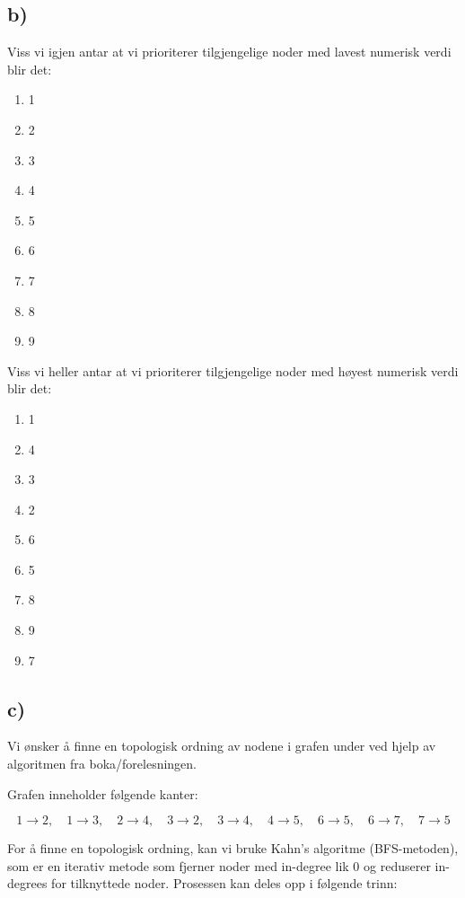 \documentclass[12pt]{article}
\begin{document}
\subsection*{b)}
Viss vi igjen antar at vi prioriterer tilgjengelige noder med lavest numerisk verdi 
blir det: 
\begin{enumerate}
    \item 1
    \item 2 
    \item 3 
    \item 4 
    \item 5 
    \item 6 
    \item 7 
    \item 8 
    \item 9 
\end{enumerate}
Viss vi heller antar at vi prioriterer tilgjengelige noder med høyest 
numerisk verdi blir det: 
\begin{enumerate}
    \item 1
    \item 4 
    \item 3 
    \item 2 
    \item 6 
    \item 5 
    \item 8 
    \item 9 
    \item 7 
\end{enumerate}

\subsection*{c)}
Vi ønsker å finne en topologisk ordning av nodene i grafen under ved hjelp av algoritmen fra boka/forelesningen.

Grafen inneholder følgende kanter:

\[
1 \to 2, \quad 1 \to 3, \quad 2 \to 4, \quad 3 \to 2, \quad 3 \to 4, \quad 4 \to 5, \quad 6 \to 5, \quad 6 \to 7, \quad 7 \to 5
\]

\noindent
For å finne en topologisk ordning, kan vi bruke Kahn's algoritme (BFS-metoden), 
som er en iterativ metode som fjerner noder med in-degree lik 0 og reduserer 
in-degrees for tilknyttede noder. Prosessen kan deles opp i følgende trinn:
\end{document}
